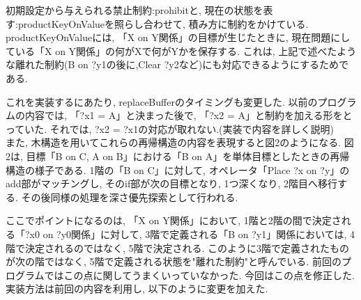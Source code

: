 \documentclass[uplatex,12pt]{jsarticle}
\begin{document}
初期設定から与えられる禁止制約:prohibitと, 現在の状態を表す:productKeyOnValueを照らし合わせて, 積み方に制約をかけている. productKeyOnValueには, 「X on Y関係」の目標が生じたときに, 現在問題にしている「X on Y関係」の何がXで何がYかを保存する. これは, 上記で述べたような離れた制約(B on ?y1の後に,Clear ?y2など)にも対応できるようにするためである.

これを実装するにあたり, replaceBufferのタイミングも変更した. 以前のプログラムの内容では, 「?x1 = A」と決まった後で, 「?x2 = A」と制約を加える形をとっていた. それでは, ?x2 = ?x1の対応が取れない.(実装で内容を詳しく説明)\\ %

また, 木構造を用いてこれらの再帰構造の内容を表現すると図2のようになる.
図2は, 目標「B on C, A on B」における「B on A」を単体目標としたときの再帰構造の様子である. 1階の「B on C」に対して, オペレータ「Place ?x on ?y」のadd部がマッチングし, そのif部が次の目標となり, 1つ深くなり, 2階目へ移行する. その後同様の処理を深さ優先探索として行われる.

ここでポイントになるのは, 「X on Y関係」において, 1階と2階の間で決定される「?x0 on ?y0関係」に対して, 3階で定義される「B on ?y1」関係においては, 4階で決定されるのではなく, 5階で決定される. このように3階で定義されたものが次の階ではなく, 5階で定義される状態を"離れた制約"と呼んでいる. 前回のプログラムではこの点に関してうまくいっていなかった. 今回はこの点を修正した. 実装方法は前回の内容を利用し, 以下のように変更を加えた.

\end{document}
